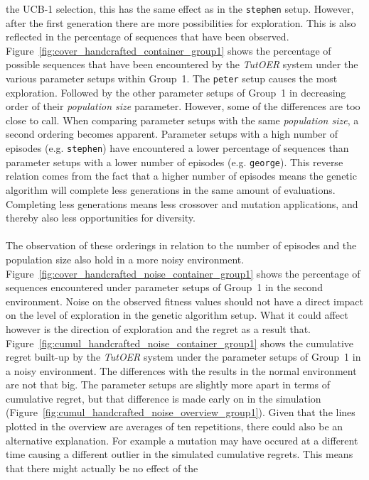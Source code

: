 the UCB-1 selection, this has the same effect as in the \texttt{stephen} setup.
However, after the first generation there are more possibilities for
exploration. This is also reflected in the percentage of sequences that have
been observed. Figure~\ref{fig:cover_handcrafted_container_group1}
shows the percentage of possible sequences that have been encountered by the
\emph{TutOER} system under the various parameter setups within Group~1. The
\texttt{peter} setup causes the most exploration. Followed by the other
parameter setups of Group~1 in decreasing order of their \emph{population size}
parameter. However, some of the differences are too close to call. When comparing
parameter setups with the same \emph{population size}, a second
ordering becomes apparent. Parameter setups with a
high number of episodes (e.g. \texttt{stephen}) have encountered a lower percentage of sequences than
parameter setups with a lower number of episodes (e.g. \texttt{george}). This
reverse relation comes from the fact that a higher number of episodes means
the genetic algorithm will complete less generations in the same amount of
evaluations. Completing less generations means less crossover and mutation
applications, and thereby also less opportunities for diversity.\\\\
\noindent
The observation of these orderings in relation to the number of episodes and
the population size also hold in a more noisy environment.
Figure~\ref{fig:cover_handcrafted_noise_container_group1} shows the
percentage of sequences encountered under parameter setups of Group~1 in the
second environment. Noise on the observed fitness values should not
have a direct impact on the level of exploration in the genetic algorithm
setup. What it could affect however is the direction of exploration and the
regret as a result that.
Figure~\ref{fig:cumul_handcrafted_noise_container_group1} shows the
cumulative regret built-up by the \emph{TutOER} system under the parameter
setups of Group~1 in a noisy environment. The differences with the results in
the normal environment are not that big. The parameter setups are slightly more apart in
terms of cumulative regret, but that difference is made early on in the
simulation (Figure~\ref{fig:cumul_handcrafted_noise_overview_group1}).
Given that the lines plotted in the overview are averages of ten repetitions,
there could also be an alternative explanation. For example a mutation may have
occured at a different time causing a different outlier in the simulated
cumulative regrets. This means that there might actually be no effect of the
